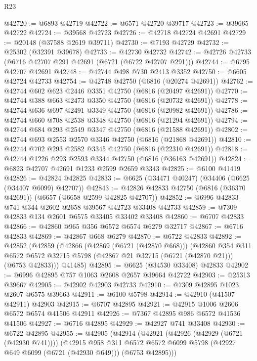 \begin{lexlean}{R23}
\begin{coremodule}
@42720 := @6893 @42719
@42722 := @6571 @42720 @39717
@42723 := @39665 @42722
@42724 := @39568 @42723
@42726 := @42718 @42724 @42691
@42729 := @20148 (@37588 @2619 @39711)
@42730 := @7193 @42729
@42732 := @25302 (@32391 @39678)
@42733 := @42730 @42732
@42742 := @42726 @42733 (@6716 @42707 @291 @42691 (@6721 (@6722 @42707 @291)))
@42744 := @6795 @42707 @42691
@42748 := @42744 @498 @730 @2413 @3352
@42750 := @6605 @42724 @42733
@42754 := @42748 @42750 (@6816 (@20274 @42691))
@42762 := @42744 @602 @623 @2446 @3351 @42750 (@6816 (@20497 @42691))
@42770 := @42744 @388 @663 @2473 @3350 @42750 (@6816 (@20732 @42691))
@42778 := @42744 @636 @697 @2491 @3349 @42750 (@6816 (@20982 @42691))
@42786 := @42744 @660 @708 @2538 @3348 @42750 (@6816 (@21294 @42691))
@42794 := @42744 @684 @293 @2549 @3347 @42750 (@6816 (@21588 @42691))
@42802 := @42744 @693 @2553 @2570 @3346 @42750 (@6816 (@21868 @42691))
@42810 := @42744 @702 @293 @2582 @3345 @42750 (@6816 (@22310 @42691))
@42818 := @42744 @1226 @293 @2593 @3344 @42750 (@6816 (@36163 @42691))
@42824 := @6823 @42707 @42691 @1233 @2599 @2659 @3343
@42825 := @6100 @41419
@42826 := @42824 @42825
@42833 := @6625 (@34471 @40247) (@34406 (@6625 (@34407 @6099) @42707))
@42843 := @42826 @42833 @42750 (@6816 (@36370 @42691)) (@6657 (@6658 @2599 @42825 @42707))
@42852 := @6996 @42833 @741 @344 @2602 @2658 @39567 @42723 @33408 @42733
@42859 := @7309 @42833 @134 @2601 @6575 @33405 @33402 @33408
@42860 := @6707 @42833
@42866 := @42860 @965 @356 @6572 @6574 @6279 @32717
@42867 := @6716 @42833
@42869 := @42867 @668 @6279
@42870 := @6722 @42833
@42892 := @42852
    (@42859
      (@42866
        (@42869 (@6721 (@42870 @668)))
        (@42860
          @354
          @311
          @6572
          @6572
          @32715
          @5798
          (@42867 @21 @32715 (@6721 (@42870 @21)))
          (@6753 @42833)))
      @41485)
@42895 := @6625 (@34530 @33408) @42833
@42902 := @6996 @42895 @757 @1063 @2608 @2657 @39664 @42722
@42903 := @25313 @39667
@42905 := @42902 @42903 @42733
@42910 := @7309 @42895 @1023 @2607 @6575 @39663
@42911 := @6100 @5798
@42914 := @42910 (@41507 @42911) @42903
@42915 := @6707 @42895
@42921 := @42915 @1006 @2606 @6572 @6574 @41506 @42911
@42926 := @7367 @42895 @986 @6572 @41536 @41506
@42927 := @6716 @42895
@42929 := @42927 @741 @33408
@42930 := @6722 @42895
@42955 := @42905
    (@42914
      (@42921
        (@42926 (@42929 (@6721 (@42930 @741))))
        (@42915
          @958
          @311
          @6572
          @6572
          @6099
          @5798
          (@42927 @649 @6099 (@6721 (@42930 @649)))
          (@6753 @42895)))

\end{coremodule}
\end{lexlean}
